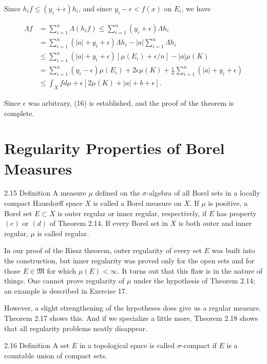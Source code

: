 \documentclass[10pt]{article}
\begin{document}
Since $h_{i} f \leq\left(y_{i}+\epsilon\right) h_{i}$, and since $y_{i}-\epsilon<f(x)$ on $E_{i}$, we have

$$
\begin{aligned}
\Lambda f & =\sum_{i=1}^{n} \Lambda\left(h_{i} f\right) \leq \sum_{i=1}^{n}\left(y_{i}+\epsilon\right) \Lambda h_{i} \\
& =\sum_{i=1}^{n}\left(|a|+y_{i}+\epsilon\right) \Lambda h_{i}-|a| \sum_{i=1}^{n} \Lambda h_{i} \\
& \leq \sum_{i=1}^{n}\left(|a|+y_{i}+\epsilon\right)\left[\mu\left(E_{i}\right)+\epsilon / n\right]-|a| \mu(K) \\
& =\sum_{i=1}^{n}\left(y_{i}-\epsilon\right) \mu\left(E_{i}\right)+2 \epsilon \mu(K)+\frac{\epsilon}{n} \sum_{i=1}^{n}\left(|a|+y_{i}+\epsilon\right) \\
& \leq \int_{X} f d \mu+\epsilon[2 \mu(K)+|a|+b+\epsilon] .
\end{aligned}
$$

Since $\epsilon$ was arbitrary, (16) is established, and the proof of the theorem is complete.

\section{Regularity Properties of Borel Measures}
2.15 Definition A measure $\mu$ defined on the $\sigma$-algebra of all Borel sets in a locally compact Hausdorff space $X$ is called a Borel measure on $X$. If $\mu$ is positive, a Borel set $E \subset X$ is outer regular or inner regular, respectively, if $E$ has property $(c)$ or $(d)$ of Theorem 2.14. If every Borel set in $X$ is both outer and inner regular, $\mu$ is called regular.

In our proof of the Riesz theorem, outer regularity of every set $E$ was built into the construction, but inner regularity was proved only for the open sets and for those $E \in \mathfrak{M}$ for which $\mu(E)<\infty$. It turns out that this flaw is in the nature of things. One cannot prove regularity of $\mu$ under the hypothesis of Theorem 2.14; an example is described in Exercise 17.

However, a slight strengthening of the hypotheses does give us a regular measure. Theorem 2.17 shows this. And if we specialize a little more, Theorem 2.18 shows that all regularity problems neatly disappear.

2.16 Definition A set $E$ in a topological space is called $\sigma$-compact if $E$ is a countable union of compact sets.
\end{document}
